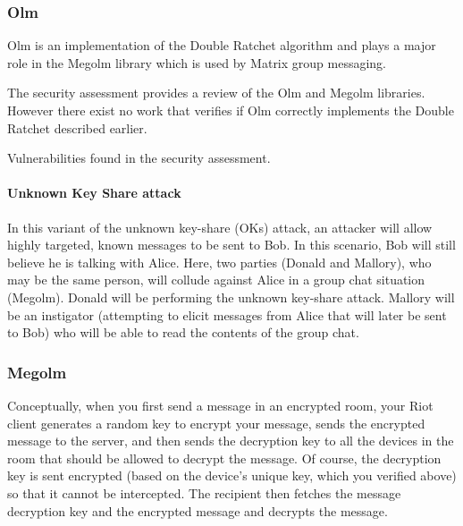 \subsubsection{Olm}
Olm is an implementation of the Double Ratchet algorithm and plays a major role in the Megolm library which is used by Matrix group messaging. 

The security assessment provides a review of the Olm and Megolm libraries. However there exist no work that verifies if Olm correctly implements the Double Ratchet described earlier.

Vulnerabilities found in the security assessment. 

\paragraph{Unknown Key Share attack}

In this variant of the unknown key-share (OKs) attack, an attacker will allow highly targeted, known messages to be sent to Bob. In this scenario, Bob will still believe he is talking with Alice. Here, two parties (Donald and Mallory), who may be the same person, will collude against Alice in a group chat situation (Megolm). Donald will be performing the unknown key-share attack. Mallory will be an instigator (attempting to elicit messages from Alice that will later be sent to Bob) who will be able to read the contents of the group chat.

\subsubsection{Megolm}



Conceptually, when you first send a message in an encrypted room, your Riot client generates a random key to encrypt your message, sends the encrypted message to the server, and then sends the decryption key to all the devices in the room that should be allowed to decrypt the message. Of course, the decryption key is sent encrypted (based on the device's unique key, which you verified above) so that it cannot be intercepted. The recipient then fetches the message decryption key and the encrypted message and decrypts the message.

